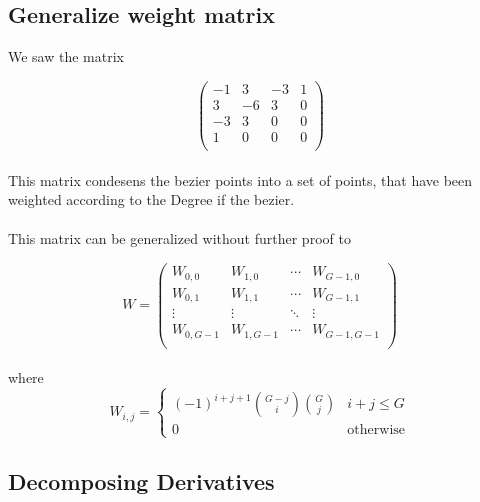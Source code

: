 \subsection{Generalize weight matrix}

We saw the matrix

\begin{equation*}
    \left(
    \begin{array}{cccc}
        -1 & 3  & -3 & 1 \\
        3  & -6 & 3  & 0 \\
        -3 & 3  & 0  & 0 \\
        1  & 0  & 0  & 0 \\
    \end{array}
    \right)
\end{equation*}
\\
This matrix condesens the bezier points into a set of points, that have been weighted according to the Degree if the bezier.
\\
\\
This matrix can be generalized without further proof to

\begin{equation*}
    W=
    \left(
    \begin{array}{cccc}
        W_{0,0}   & W_{1,0}   & \cdots & W_{G-1,0}   \\
        W_{0,1}   & W_{1,1}   & \cdots & W_{G-1,1}   \\
        \vdots    & \vdots    & \ddots & \vdots      \\
        W_{0,G-1} & W_{1,G-1} & \cdots & W_{G-1,G-1} \\
    \end{array}
    \right)
\end{equation*}
\\
where
\\
\begin{equation*}
    W_{i,j}=\begin{cases}
        (-1)^{i+j+1} {G-j \choose i} {G \choose j} & i + j \le G      \\
        0                                          & \text{otherwise}
    \end{cases}
\end{equation*}

\subsection{Decomposing Derivatives}

